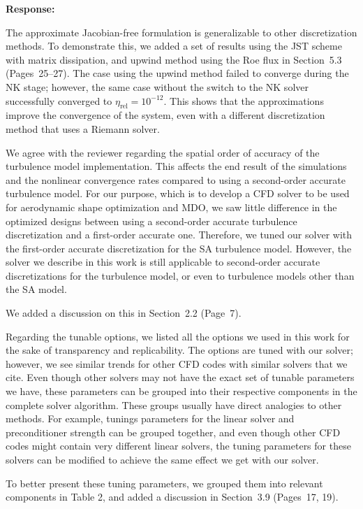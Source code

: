 \documentclass[dvipsnames]{article}
\newcommand{\responsecolor}{MidnightBlue}
\newcommand{\actioncolor}{RedOrange}
\newenvironment{response}
{
\textbf{\color{\responsecolor} Response:}
\color{\responsecolor}
}
{
\vspace{20pt}
}
\newcommand{\action}[1]{{\color{\actioncolor} {#1}}}
\begin{document}
\begin{response}

The approximate Jacobian-free formulation is generalizable to other discretization methods.
\action{To demonstrate this, we added a set of results using the JST scheme with matrix dissipation, and upwind method using the Roe flux in Section~5.3 (Pages~25--27).}
The case using the upwind method failed to converge during the NK stage; however, the same case without the switch to the NK solver successfully converged to $\eta_{\text{rel}} = 10^{-12}$.
This shows that the approximations improve the convergence of the system, even with a different discretization method that uses a Riemann solver.

We agree with the reviewer regarding the spatial order of accuracy of the turbulence model implementation.
This affects the end result of the simulations and the nonlinear convergence rates compared to using a second-order accurate turbulence model.
For our purpose, which is to develop a CFD solver to be used for aerodynamic shape optimization and MDO, we saw little difference in the optimized designs between using a second-order accurate turbulence discretization and a first-order accurate one.
Therefore, we tuned our solver with the first-order accurate discretization for the SA turbulence model.
However, the solver we describe in this work is still applicable to second-order accurate discretizations for the turbulence model, or even to turbulence models other than the SA model.

\action{We added a discussion on this in Section~2.2 (Page~7).}

Regarding the tunable options, we listed all the options we used in this work for the sake of transparency and replicability.
The options are tuned with our solver; however, we see similar trends for other CFD codes with similar solvers that we cite.
Even though other solvers may not have the exact set of tunable parameters we have, these parameters can be grouped into their respective components in the complete solver algorithm.
These groups usually have direct analogies to other methods.
For example, tunings parameters for the linear solver and preconditioner strength can be grouped together, and even though other CFD codes might contain very different linear solvers, the tuning parameters for these solvers can be modified to achieve the same effect we get with our solver.

\action{To better present these tuning parameters, we grouped them into relevant components in Table 2, and added a discussion in Section~3.9 (Pages~17, 19).}
\end{response}
\end{document}
